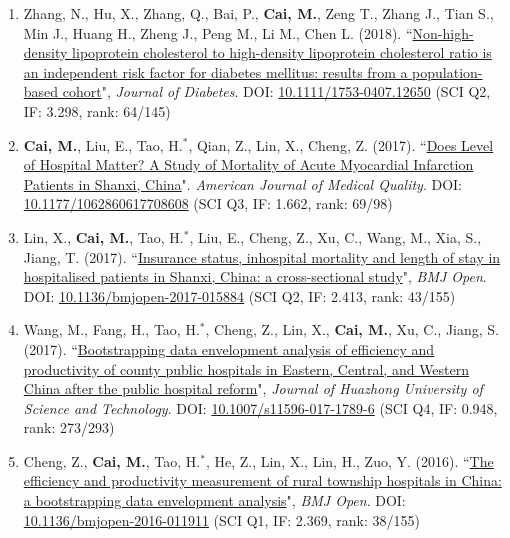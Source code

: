 \documentclass[11pt, a4paper]{article}
\newcommand{\years}[1]{\marginnote{\scriptsize #1}}
\begin{document}
\begin{enumerate}[leftmargin=0ex,itemsep=1ex]
		\item Zhang, N., Hu, X., Zhang, Q., Bai, P., \textbf{Cai, M.}, Zeng T., Zhang J., Tian S., Min J., Huang H., Zheng J., Peng M., Li M., Chen L. (2018). ``\ul{Non-high-density lipoprotein cholesterol to high-density lipoprotein cholesterol ratio is an independent risk factor for diabetes mellitus: results from a population-based cohort}", \emph{Journal of Diabetes}. DOI: \href{https://doi.org/10.1111/1753-0407.12650}{10.1111/1753-0407.12650} (SCI Q2, IF: 3.298, rank: 64/145)
		
		\item \years{2017}\textcolor{RubineRed}{\textbf{Cai, M.}}, Liu, E., Tao, H.$^\ast$, Qian, Z., Lin, X., Cheng, Z. (2017). ``\ul{Does Level of Hospital Matter? A Study of Mortality of Acute Myocardial Infarction Patients in Shanxi, China}". \emph{American Journal of Medical Quality}. DOI: \href{https://doi.org/10.1177/1062860617708608}{10.1177/1062860617708608} (SCI Q3, IF: 1.662, rank: 69/98)
		
		\item Lin, X., \textbf{Cai, M.}, Tao, H.$^\ast$, Liu, E., Cheng, Z., Xu, C., Wang, M., Xia, S., Jiang, T. (2017). ``\ul{Insurance status, inhospital mortality and length of stay in hospitalised patients in Shanxi, China: a cross-sectional study}", \emph{BMJ Open}. DOI: \href{https://doi.org/10.1136/bmjopen-2017-015884}{10.1136/bmjopen-2017-015884} (SCI Q2, IF: 2.413, rank: 43/155)
		
		\item Wang, M., Fang, H., Tao, H.$^\ast$, Cheng, Z., Lin, X., \textbf{Cai, M.}, Xu, C., Jiang, S. (2017). ``\ul{Bootstrapping data envelopment analysis of efficiency and productivity of county public hospitals in Eastern, Central, and Western China after the public hospital reform}", \emph{Journal of Huazhong University of Science and Technology}. DOI: \href{https://doi.org/10.1007/s11596-017-1789-6}{10.1007/s11596-017-1789-6} (SCI Q4, IF: 0.948, rank: 273/293)
		
		\item \years{2016}Cheng, Z., \textbf{Cai, M.}, Tao, H.$^\ast$, He, Z., Lin, X., Lin, H., Zuo, Y. (2016). ``\ul{The efficiency and productivity measurement of rural township hospitals in China: a bootstrapping data envelopment analysis}", \emph{BMJ Open}. DOI: \href{https://doi.org/10.1136/bmjopen-2016-011911}{10.1136/bmjopen-2016-011911} (SCI Q1, IF: 2.369, rank: 38/155)
		

\end{enumerate}
\end{document}
